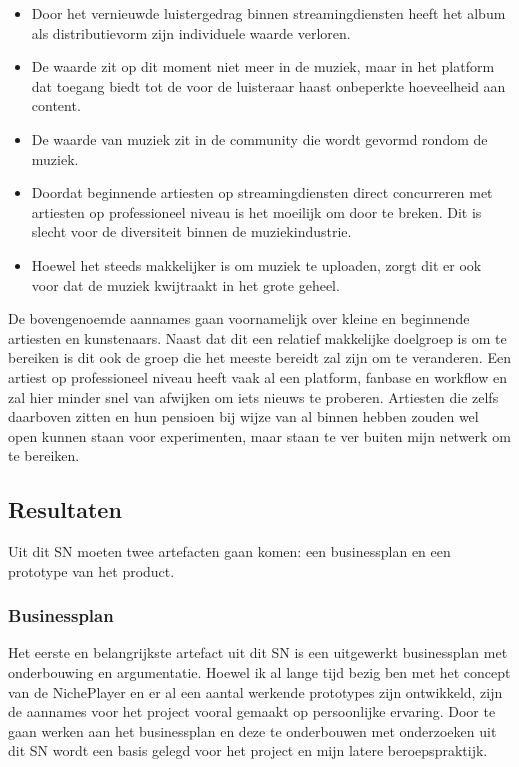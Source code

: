 \begin{itemize}
    \item Door het vernieuwde luistergedrag binnen streamingdiensten heeft het album als distributievorm zijn individuele waarde verloren.
    \item De waarde zit op dit moment niet meer in de muziek, maar in het platform dat toegang biedt tot de voor de luisteraar haast onbeperkte hoeveelheid aan content.
    \item De waarde van muziek zit in de community die wordt gevormd rondom de muziek.
    \item Doordat beginnende artiesten op streamingdiensten direct concurreren met artiesten op professioneel niveau is het moeilijk om door te breken. Dit is slecht voor de diversiteit binnen de muziekindustrie.
    \item Hoewel het steeds makkelijker is om muziek te uploaden, zorgt dit er ook voor dat de muziek kwijtraakt in het grote geheel.
\end{itemize}

De bovengenoemde aannames gaan voornamelijk over kleine en beginnende artiesten en kunstenaars. Naast dat dit een relatief makkelijke doelgroep is om te bereiken is dit ook de groep die het meeste bereidt zal zijn om te veranderen. Een artiest op professioneel niveau heeft vaak al een platform, fanbase en workflow en zal hier minder snel van afwijken om iets nieuws te proberen. Artiesten die zelfs daarboven zitten en hun pensioen bij wijze van al binnen hebben zouden wel open kunnen staan voor experimenten, maar staan te ver buiten mijn netwerk om te bereiken.

\subsection{Resultaten}
Uit dit SN moeten twee artefacten gaan komen: een businessplan en een prototype van het product.

\subsubsection*{Businessplan}
Het eerste en belangrijkste artefact uit dit SN is een uitgewerkt businessplan met onderbouwing en argumentatie. Hoewel ik al lange tijd bezig ben met het concept van de NichePlayer en er al een aantal werkende prototypes zijn ontwikkeld, zijn de aannames voor het project vooral gemaakt op persoonlijke ervaring. Door te gaan werken aan het businessplan en deze te onderbouwen met onderzoeken uit dit SN wordt een basis gelegd voor het project en mijn latere beroepspraktijk.

